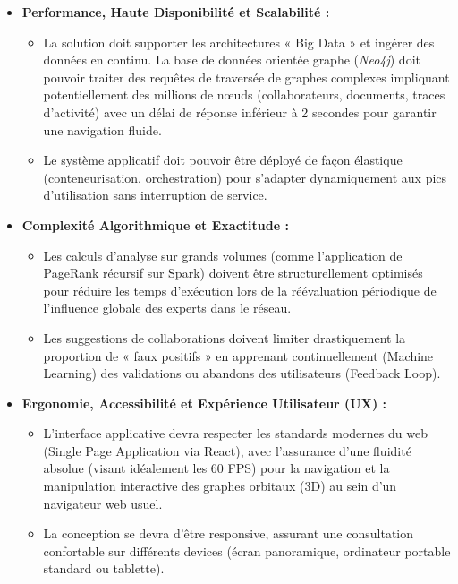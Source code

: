 \documentclass[12pt,a4paper]{article}
\begin{document}
\begin{itemize}[leftmargin=*]
    \item \textbf{Performance, Haute Disponibilité et Scalabilité :}
    \begin{itemize}[leftmargin=*, label=-]
        \item La solution doit supporter les architectures « Big Data » et ingérer des données en continu. La base de données orientée graphe (\textit{Neo4j}) doit pouvoir traiter des requêtes de traversée de graphes complexes impliquant potentiellement des millions de nœuds (collaborateurs, documents, traces d'activité) avec un délai de réponse inférieur à 2 secondes pour garantir une navigation fluide.
        \item Le système applicatif doit pouvoir être déployé de façon élastique (conteneurisation, orchestration) pour s'adapter dynamiquement aux pics d'utilisation sans interruption de service.
    \end{itemize}
    
    \item \textbf{Complexité Algorithmique et Exactitude :}
    \begin{itemize}[leftmargin=*, label=-]
        \item Les calculs d'analyse sur grands volumes (comme l'application de PageRank récursif sur Spark) doivent être structurellement optimisés pour réduire les temps d'exécution lors de la réévaluation périodique de l'influence globale des experts dans le réseau.
        \item Les suggestions de collaborations doivent limiter drastiquement la proportion de « faux positifs » en apprenant continuellement (Machine Learning) des validations ou abandons des utilisateurs (Feedback Loop).
    \end{itemize}

    \item \textbf{Ergonomie, Accessibilité et Expérience Utilisateur (UX) :}
    \begin{itemize}[leftmargin=*, label=-]
        \item L'interface applicative devra respecter les standards modernes du web (Single Page Application via React), avec l’assurance d’une fluidité absolue (visant idéalement les 60 FPS) pour la navigation et la manipulation interactive des graphes orbitaux (3D) au sein d'un navigateur web usuel.
        \item La conception se devra d'être responsive, assurant une consultation confortable sur différents devices (écran panoramique, ordinateur portable standard ou tablette).
    \end{itemize}


\end{itemize}
\end{document}
